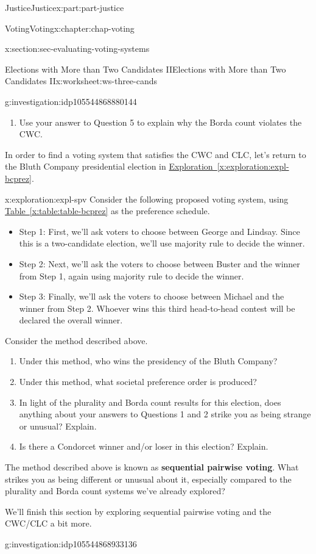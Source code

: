 \documentclass[oneside,10pt,]{book}
\newcommand{\xreffont}{\relax}
\newcommand{\terminology}[1]{\textbf{#1}}
\numberwithin{equation}{section}
\begin{document}
\begin{partptx}{Justice}{}{Justice}{}{}{x:part:part-justice}
\begin{chapterptx}{Voting}{}{Voting}{}{}{x:chapter:chap-voting}
\begin{sectionptx}{}{}{}{}{}{x:section:sec-evaluating-voting-systems}
\begin{worksheet-subsection}{Elections with More than Two Candidates II}{}{Elections with More than Two Candidates II}{}{}{x:worksheet:ws-three-cands}
\begin{investigation}{}{g:investigation:idp105544868880144}
\begin{enumerate}[label=(\alph*)]
\item{}Use your answer to Question 5 to explain why the Borda count violates the CWC.%
\end{enumerate}
\end{investigation}%
In order to find a voting system that satisfies the CWC and CLC, let's return to the Bluth Company presidential election in \hyperref[x:exploration:expl-bcprez]{Exploration~{\xreffont\ref{x:exploration:expl-bcprez}}}.%
\begin{exploration}{}{x:exploration:expl-spv}%
Consider the following proposed voting system, using \hyperref[x:table:table-bcprez]{Table~{\xreffont\ref{x:table:table-bcprez}}} as the preference schedule.%
%
\begin{itemize}[label=\textbullet]
\item{}Step 1: First, we'll ask voters to choose between George and Lindsay. Since this is a two-candidate election, we'll use majority rule to decide the winner.%
\item{}Step 2: Next, we'll ask the voters to choose between Buster and the winner from Step 1, again using majority rule to decide the winner.%
\item{}Step 3: Finally, we'll ask the voters to choose between Michael and the winner from Step 2. Whoever wins this third head-to-head contest will be declared the overall winner.%
\end{itemize}
Consider the method described above.%
%
\begin{enumerate}[label=(\alph*)]
\item{}Under this method, who wins the presidency of the Bluth Company?%
\item{}Under this method, what societal preference order is produced?%
\item{}In light of the plurality and Borda count results for this election, does anything about your answers to Questions 1 and 2 strike you as being strange or unusual? Explain.%
\item{}Is there a Condorcet winner and\slash{}or loser in this election? Explain.%
\end{enumerate}
The method described above is known as \terminology{sequential pairwise voting}. What strikes you as being different or unusual about it, especially compared to the plurality and Borda count systems we've already explored?%
\end{exploration}%
We'll finish this section by exploring sequential pairwise voting and the CWC\slash{}CLC a bit more.%
\begin{investigation}{}{g:investigation:idp105544868933136}%

\end{investigation}
\end{worksheet-subsection}
\end{sectionptx}
\end{chapterptx}
\end{partptx}
\end{document}
